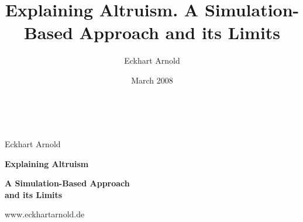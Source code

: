 \title{Explaining Altruism. A Simulation-Based Approach and its
Limits}

\author{Eckhart Arnold}
\date{March 2008}


\begin{titlepage}

\setlength{\parindent}{0em}
\begin{flushleft} 

\ {  }

\vspace{4cm}
{\Large Eckhart Arnold}

\setlength{\parskip}{4cm}
{\huge\bf Explaining Altruism}

\setlength{\parskip}{0.3cm}
{\huge\bf A Simulation-Based Approach\\and its Limits}

% 
% 

\end{flushleft} 

\begin{center} 

\setlength{\parskip}{10cm}
{\footnotesize www.eckhartarnold.de} 
\end{center}


\end{titlepage}
